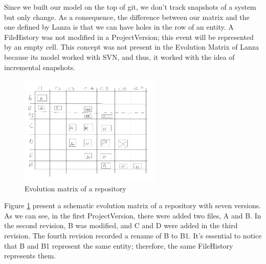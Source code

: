 Since we built our model on the top of git, we don't track snapshots of a system but only change. 
As a consequence, the difference between our matrix and the one defined by Lanza \cite{Lanza2001} is that we can have holes in the row of an entity.
A FileHistory was not modified in a ProjectVersion; this event will be represented by an empty cell.
This concept was not present in the Evolution Matrix of Lanza because its model worked with SVN, and thus, it worked with the idea of incremental snapshots.  

\begin{figure}
    \center
    \includegraphics[width=0.6\textwidth]{ApproachMatrix.jpg}
    \caption{Evolution matrix of a repository}
    \label{fig:evolutionMatrixApproach}
\end{figure}
Figure \ref{fig:evolutionMatrixApproach} present a schematic evolution matrix of a repository with seven versions.
As we can see, in the first ProjectVersion, there were added two files, A and B. In the second revision, B was modified, and C and D were added in the third revision.
The fourth revision recorded a rename of B to B1.
It's essential to notice that B and B1 represent the same entity; therefore, the same FileHistory represents them.\\


